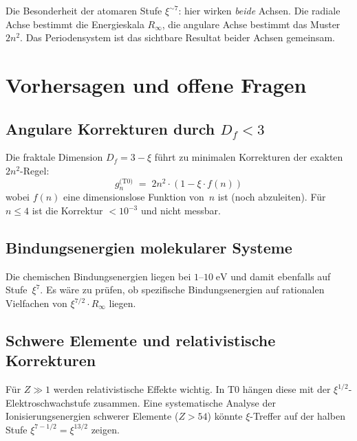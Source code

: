 \vspace{0.5em}

Die Besonderheit der atomaren Stufe $\xi^{\sim 7}$: hier wirken
\emph{beide} Achsen. Die radiale Achse bestimmt die Energieskala $R_\infty$,
die angulare Achse bestimmt das Muster $2n^2$. Das Periodensystem ist
das sichtbare Resultat beider Achsen gemeinsam.

\section{Vorhersagen und offene Fragen}
\label{sec:vorhersagen}

\subsection{Angulare Korrekturen durch \texorpdfstring{$D_f < 3$}{Df<3}}

Die fraktale Dimension $D_f = 3 - \xi$ führt zu minimalen Korrekturen
der exakten $2n^2$-Regel:
\begin{equation}
  g_n^\text{(T0)} \;=\; 2n^2 \cdot (1 - \xi \cdot f(n))
\end{equation}
wobei $f(n)$ eine dimensionslose Funktion von~$n$ ist (noch abzuleiten).
Für $n \leq 4$ ist die Korrektur $< 10^{-3}$ und nicht messbar.

\subsection{Bindungsenergien molekularer Systeme}

Die chemischen Bindungsenergien liegen bei $1$–$10\;\text{eV}$ und damit
ebenfalls auf Stufe~$\xi^7$. Es wäre zu prüfen, ob spezifische Bindungsenergien
auf rationalen Vielfachen von $\xi^{7/2} \cdot R_\infty$ liegen.

\subsection{Schwere Elemente und relativistische Korrekturen}

Für $Z \gg 1$ werden relativistische Effekte wichtig. In T0 hängen diese
mit der $\xi^{1/2}$-Elektroschwachstufe zusammen. Eine systematische
Analyse der Ionisierungsenergien schwerer Elemente ($Z > 54$) könnte
$\xi$-Treffer auf der halben Stufe $\xi^{7-1/2} = \xi^{13/2}$ zeigen.

